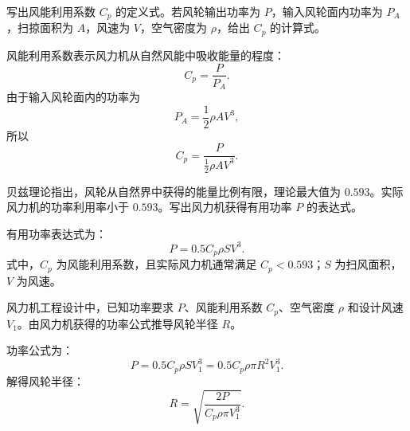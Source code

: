 \begin{problem}[风能利用系数]\label{exer:calc_03_wind_p066_01}
写出风能利用系数 \(C_p\) 的定义式。若风轮输出功率为 \(P\)，输入风轮面内功率为 \(P_A\)，扫掠面积为 \(A\)，风速为 \(V\)，空气密度为 \(\rho\)，给出 \(C_p\) 的计算式。
\end{problem}

\begin{solution}
风能利用系数表示风力机从自然风能中吸收能量的程度：
\begin{equation}
C_p = \frac{P}{P_A}.
\end{equation}
由于输入风轮面内的功率为
\begin{equation}
P_A = \frac{1}{2}\rho A V^3,
\end{equation}
所以
\begin{equation}
C_p
= \frac{P}{\frac{1}{2}\rho A V^3}.
\end{equation}
\end{solution}

\begin{problem}[贝兹极限与有用功率]\label{exer:calc_03_wind_p074_01}
贝兹理论指出，风轮从自然界中获得的能量比例有限，理论最大值为 \(0.593\)。实际风力机的功率利用率小于 \(0.593\)。写出风力机获得有用功率 \(P\) 的表达式。
\end{problem}

\begin{solution}
有用功率表达式为：
\begin{equation}
P = 0.5 C_p \rho S V^3.
\end{equation}
式中，\(C_p\) 为风能利用系数，且实际风力机通常满足 \(C_p < 0.593\)；\(S\) 为扫风面积，\(V\) 为风速。
\end{solution}

\begin{problem}[由目标功率反推风轮半径]\label{exer:calc_03_wind_p079_01}
风力机工程设计中，已知功率要求 \(P\)、风能利用系数 \(C_p\)、空气密度 \(\rho\) 和设计风速 \(V_1\)。由风力机获得的功率公式推导风轮半径 \(R\)。
\end{problem}

\begin{solution}
功率公式为：
\begin{equation}
P = 0.5 C_p \rho S V_1^3
  = 0.5 C_p \rho \pi R^2 V_1^3.
\end{equation}
解得风轮半径：
\begin{equation}
R = \sqrt{\frac{2P}{C_p\rho\pi V_1^3}}.
\end{equation}
\end{solution}

